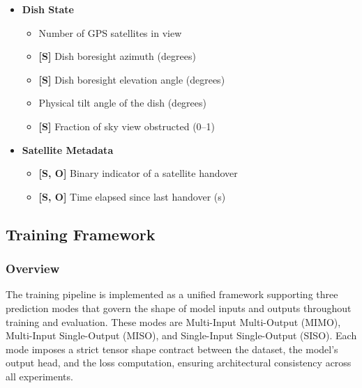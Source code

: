 \documentclass[12pt]{article}
\begin{document}
\begin{itemize}
\begin{itemize}
        \item \textbf{[O]} Signal-to-interference-plus-noise ratio (dB)
        \item \textbf{[Q]} Reference signal received power (dBm)
        \item \textbf{[Q]} Reference signal received quality (dB)
        \item \textbf{[Q]} Signal-to-interference-plus-noise ratio (dB)
    \end{itemize}
    \item \textbf{Dish State}
    \begin{itemize}
        \item Number of GPS satellites in view
        \item \textbf{[S]} Dish boresight azimuth (degrees)
        \item \textbf{[S]} Dish boresight elevation angle (degrees)
        \item Physical tilt angle of the dish (degrees)
        \item \textbf{[S]} Fraction of sky view obstructed (0--1)
    \end{itemize}
    \item \textbf{Satellite Metadata}
    \begin{itemize}
        \item \textbf{[S, O]} Binary indicator of a satellite handover
        \item \textbf{[S, O]} Time elapsed since last handover (s)
    \end{itemize}
\end{itemize}

\subsection{Training Framework}

\subsubsection{Overview}

The training pipeline is implemented as a unified framework supporting three prediction modes that govern the shape of model inputs and outputs throughout training and evaluation. These modes are Multi-Input Multi-Output (MIMO), Multi-Input Single-Output (MISO), and Single-Input Single-Output (SISO). Each mode imposes a strict tensor shape contract between the dataset, the model's output head, and the loss computation, ensuring architectural consistency across all experiments.
\end{document}

